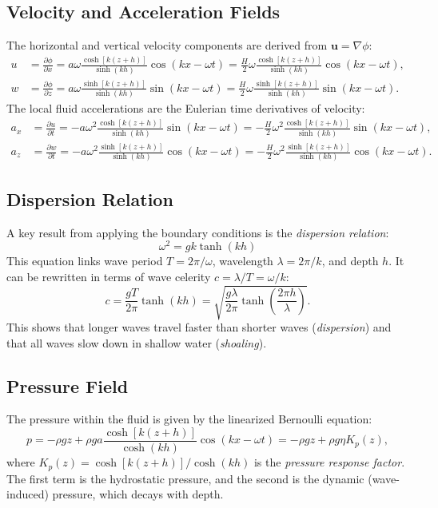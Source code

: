\documentclass[11pt,a4paper]{article}
\begin{document}
\subsection{Velocity and Acceleration Fields}
The horizontal and vertical velocity components are derived from $\mathbf{u} = \nabla \phi$:
\begin{align}
u &= \frac{\partial \phi}{\partial x} = a\omega \frac{\cosh[k(z+h)]}{\sinh(kh)} \cos(kx - \omega t) = \frac{H}{2}\omega \frac{\cosh[k(z+h)]}{\sinh(kh)} \cos(kx - \omega t), \\
w &= \frac{\partial \phi}{\partial z} = a\omega \frac{\sinh[k(z+h)]}{\sinh(kh)} \sin(kx - \omega t) = \frac{H}{2}\omega \frac{\sinh[k(z+h)]}{\sinh(kh)} \sin(kx - \omega t).
\end{align}
The local fluid accelerations are the Eulerian time derivatives of velocity:
\begin{align}
a_x &= \frac{\partial u}{\partial t} = -a\omega^2 \frac{\cosh[k(z+h)]}{\sinh(kh)} \sin(kx - \omega t) = -\frac{H}{2}\omega^2 \frac{\cosh[k(z+h)]}{\sinh(kh)} \sin(kx - \omega t), \\
a_z &= \frac{\partial w}{\partial t} = -a\omega^2 \frac{\sinh[k(z+h)]}{\sinh(kh)} \cos(kx - \omega t) = -\frac{H}{2}\omega^2 \frac{\sinh[k(z+h)]}{\sinh(kh)} \cos(kx - \omega t).
\end{align}


\subsection{Dispersion Relation}
A key result from applying the boundary conditions is the \emph{dispersion relation}:
\begin{equation}
\omega^2 = gk \tanh(kh)
\label{eq:dispersion}
\end{equation}
This equation links wave period $T = 2\pi/\omega$, wavelength $\lambda = 2\pi/k$, and depth $h$. It can be rewritten in terms of wave celerity $c = \lambda/T = \omega/k$:
\begin{equation}
c = \frac{gT}{2\pi} \tanh(kh) = \sqrt{\frac{g\lambda}{2\pi} \tanh\left(\frac{2\pi h}{\lambda}\right)}.
\end{equation}
This shows that longer waves travel faster than shorter waves (\emph{dispersion}) and that all waves slow down in shallow water (\emph{shoaling}).

\subsection{Pressure Field}
The pressure within the fluid is given by the linearized Bernoulli equation:
\begin{equation}
p = -\rho g z + \rho g a \frac{\cosh[k(z+h)]}{\cosh(kh)} \cos(kx - \omega t) = -\rho g z + \rho g \eta K_p(z),
\label{eq:airypressure}
\end{equation}
where $K_p(z) = \cosh[k(z+h)] / \cosh(kh)$ is the \emph{pressure response factor}. The first term is the hydrostatic pressure, and the second is the dynamic (wave-induced) pressure, which decays with depth.
\end{document}
